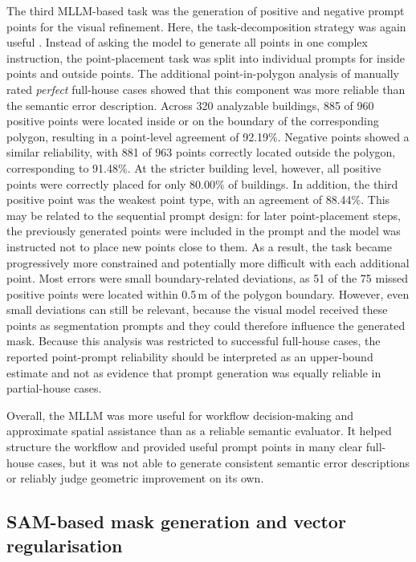 The third MLLM-based task was the generation of positive and negative prompt points for the visual refinement. Here, the task-decomposition strategy was again useful \citep{zhou2022least, Zaid_prompt_decompisiton}. Instead of asking the model to generate all points in one complex instruction, the point-placement task was split into individual prompts for inside points and outside points. The additional point-in-polygon analysis of manually rated \textit{perfect} full-house cases showed that this component was more reliable than the semantic error description. Across 320 analyzable buildings, 885 of 960 positive points were located inside or on the boundary of the corresponding polygon, resulting in a point-level agreement of 92.19\%. Negative points showed a similar reliability, with 881 of 963 points correctly located outside the polygon, corresponding to 91.48\%. At the stricter building level, however, all positive points were correctly placed for only 80.00\% of buildings. In addition, the third positive point was the weakest point type, with an agreement of 88.44\%. This may be related to the sequential prompt design: for later point-placement steps, the previously generated points were included in the prompt and the model was instructed not to place new points close to them. As a result, the task became progressively more constrained and potentially more difficult with each additional point. Most errors were small boundary-related deviations, as 51 of the 75 missed positive points were located within 0.5\,m of the polygon boundary. However, even small deviations can still be relevant, because the visual model received these points as segmentation prompts and they could therefore influence the generated mask. Because this analysis was restricted to successful full-house cases, the reported point-prompt reliability should be interpreted as an upper-bound estimate and not as evidence that prompt generation was equally reliable in partial-house cases.

Overall, the MLLM was more useful for workflow decision-making and approximate spatial assistance than as a reliable semantic evaluator. It helped structure the workflow and provided useful prompt points in many clear full-house cases, but it was not able to generate consistent semantic error descriptions or reliably judge geometric improvement on its own.

\subsection{SAM-based mask generation and vector regularisation}

